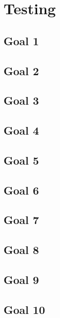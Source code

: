\chapter{Testing}

\section{Goal 1}

\section{Goal 2}

\section{Goal 3}

\section{Goal 4}

\section{Goal 5}

\section{Goal 6}

\section{Goal 7}

\section{Goal 8}

\section{Goal 9}

\section{Goal 10}
